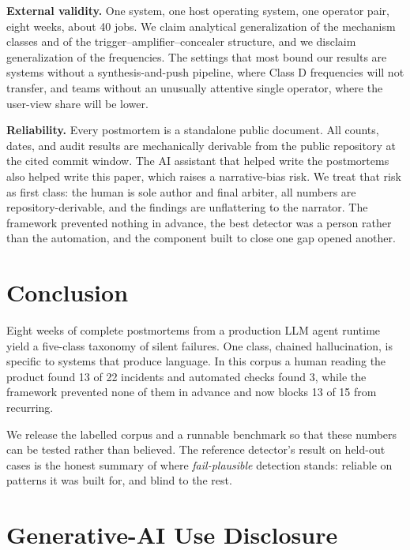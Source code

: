 \documentclass[conference]{IEEEtran}
\newcommand{\failplausible}{\emph{fail-plausible}}
\begin{document}
\textbf{External validity.} One system, one host operating system, one
operator pair, eight weeks, about 40 jobs. We claim analytical
generalization of the mechanism classes and of the
trigger--amplifier--concealer structure, and we disclaim generalization of
the frequencies. The settings that most bound our results are systems
without a synthesis-and-push pipeline, where Class D frequencies will not
transfer, and teams without an unusually attentive single operator, where
the user-view share will be lower.

\textbf{Reliability.} Every postmortem is a standalone public document. All
counts, dates, and audit results are mechanically derivable from the public
repository at the cited commit window. The AI assistant that helped write
the postmortems also helped write this paper, which raises a narrative-bias
risk. We treat that risk as first class: the human is sole author and final
arbiter, all numbers are repository-derivable, and the findings are
unflattering to the narrator. The framework prevented nothing in advance,
the best detector was a person rather than the automation, and the component
built to close one gap opened another.

\section{Conclusion}

Eight weeks of complete postmortems from a production LLM agent runtime
yield a five-class taxonomy of silent failures. One class, chained
hallucination, is specific to systems that produce language. In this corpus
a human reading the product found 13 of 22 incidents and automated checks
found 3, while the framework prevented none of them in advance and now
blocks 13 of 15 from recurring.

We release the labelled corpus and a runnable benchmark so that these
numbers can be tested rather than believed. The reference detector's result
on held-out cases is the honest summary of where \failplausible{} detection
stands: reliable on patterns it was built for, and blind to the rest.

\section*{Generative-AI Use Disclosure}
\end{document}
